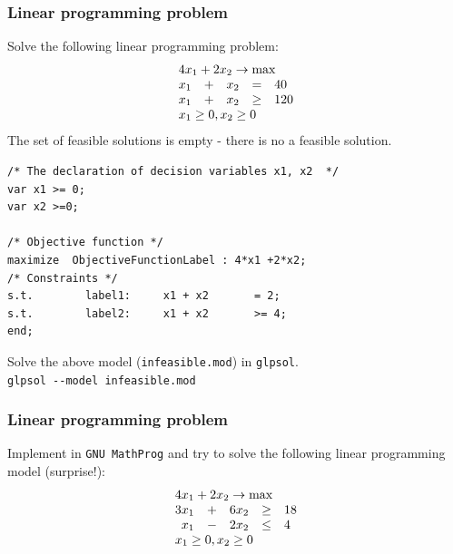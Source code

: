 \documentclass[landscape]{beamer}
\begin{document}
\begin{frame}[fragile]
  \frametitle{Linear programming problem}
  \vspace{-0.5cm}
\begin{small}
Solve the following linear programming problem:
\[
\begin{array}{rcrlll} 
               \multicolumn{5}{l}{4x_1+2x_2\rightarrow \max}\\ 
                                            x_1&+&x_2&= &40\\
                                            x_1&+&x_2&\geq&120 \\ 
                                 \multicolumn{5}{l}{x_1   \geq  0, x_2 \geq 0} 
\end{array}
\]
The set of feasible solutions is empty - there is no a feasible solution. 
\end{small}
\begin{tiny}
\begin{verbatim}
/* The declaration of decision variables x1, x2  */
var x1 >= 0;
var x2 >=0;

/* Objective function */
maximize  ObjectiveFunctionLabel : 4*x1 +2*x2;
/* Constraints */
s.t.        label1:     x1 + x2       = 2;
s.t.        label2:     x1 + x2       >= 4; 
end;
\end{verbatim}
\end{tiny}
\begin{small}
\vspace{-0.2cm}
Solve the above model (\texttt{infeasible.mod}) in \texttt{glpsol}.\\
\verb=glpsol --model infeasible.mod=
\end{small}
\end{frame}


\begin{frame}[fragile]
  \frametitle{Linear programming problem}
  \vspace{-0.5cm}
\begin{small}
Implement  in \verb=GNU MathProg= and try to solve the following linear programming
model (surprise!):
\[
\begin{array}{rcrlll} 
               \multicolumn{5}{l}{4x_1+2x_2\rightarrow \max}\\ 
                                            3x_1&+&6x_2&\geq  &18\\
                                            x_1&-&2x_2&\leq&4 \\ 
                                 \multicolumn{5}{l}{x_1   \geq  0, x_2 \geq 0} 
\end{array}
\]
\end{small}
\end{frame}
\end{document}
